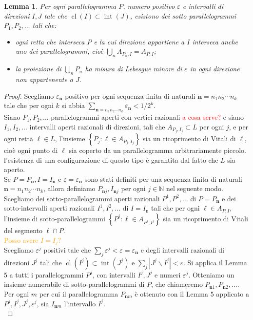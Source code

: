 \documentclass[a4paper, twoside,openright]{article}
\newcommand{\<}{\langle}
\renewcommand{\>}{\rangle}
\newtheorem{lemma}[teo]{Lemma}
\begin{document}
\begin{lemma}
Per ogni parallelogramma $P$, numero positivo $\varepsilon$ e intervalli di direzioni $I, J$ tale che $\operatorname{cl}(I) \subset \operatorname{int}(J)$, esistono dei sotto parallelogrammi $P_{1}, P_{2}, \ldots$ tali che:
\begin{itemize}
	\item ogni retta che interseca $P$ e la cui direzione appartiene a $I$ interseca anche uno dei parallelogrammi, cioè $\bigcup_{n} A_{P_{n}, I}=A_{P, I}$;
	\item la proiezione di $\bigcup_{n} P_{n}$ ha misura di Lebesgue minore di $\varepsilon$ in ogni direzione non appartenente a $J$.
\end{itemize}
\end{lemma}

\begin{proof}
Scegliamo $\varepsilon_{\mathbf{n}}$ positivo per ogni sequenza finita di naturali $\mathbf{n}=n_{1} n_{2} \cdots n_{k}$ tale che per ogni $k$ si abbia $\sum_{\mathbf{n}=n_{1} n_{2} \cdots n_{k}} \varepsilon_{\mathbf{n}}<1 / 2^{k}$.\\
Siano $P_{1}, P_{2}, \ldots$ parallelogrammi aperti con vertici razionali \textcolor{red}{a cosa serve?} e siano $I_{1}, I_{2}, \ldots$ intervalli aperti razionali di direzioni, tali che $A_{P_{j}, I_{j}} \subset L$ per ogni $j$, e per ogni retta $\ell \in L$, l'insieme $\left\{P_{j}: \ell \in A_{P_{j}, I_{j}}\right\}$ sia un ricoprimento di Vitali di $\ell$, cioè ogni punto di $\ell$ sia coperto da un parallelogramma arbitrariamente piccolo. l'esistenza di una configurazione di questo tipo è garantita dal fatto che $L$ sia aperto.\\
Se $P=P_{\mathbf{n}}, I=I_{\mathbf{n}}$ e $\varepsilon=\varepsilon_{\mathbf{n}}$ sono stati definiti per una sequenza finita di naturali $\mathbf{n}=n_{1} n_{2} \cdots n_{k}$, allora definiamo $P_{\mathbf{n} j}, I_{\mathbf{n} j}$ per ogni $j \in \mathbb{N}$ nel seguente modo.\\
Scegliamo dei sotto-parallelogrammi aperti razionali $P^{1}, P^{2}, \ldots$ di $P=P_{\mathbf{n}}$ e dei sotto-intervalli aperti razionali $I^{1}, I^{2}, \ldots$ di $I=I_{\mathrm{n}}$ tali che per ogni $\ell \in A_{P, I}$, l'insieme di sotto-parallelogrammi $\left\{P^{j}: \ell \in A_{P^{j}, I^{j}}\right\}$
sia un ricoprimento di Vitali del segmento $\ell \cap P$. \\
\textcolor{orange}{Posso avere $I=I_j?$}\\
Scegliamo $\varepsilon^{j}$ positivi tale che $\sum_{j} \varepsilon^{j}<\varepsilon=\varepsilon_{\mathbf{n}}$ e degli intervalli razionali di direzioni $J^{j}$ tali che $\operatorname{cl}\left(I^{j}\right) \subset \operatorname{int}\left(J^{j}\right)$ e $\sum_{j}\left|J^{j} \backslash I^{j}\right|<\varepsilon$. Si applica il Lemma 5 a tutti i parallelogrammi $P^{j}$, con intervalli $I^{j}, J^{j}$ e numeri $\varepsilon^{j}$. Otteniamo un insieme numerabile di sotto-parallelogrammi di $P$, che chiameremo $P_{\mathbf{n} 1}, P_{\mathbf{n} 2}, \ldots$. Per ogni $m$ per cui il parallelogramma $P_{\mathbf{n} m}$ è ottenuto con il Lemma 5 applicato a $P^{j}, I^{j}, J^{j}, \varepsilon^{j}$, sia $I_{\mathbf{n} m}$ l'intervallo $I^{j}$.\\

\end{proof}
\end{document}
